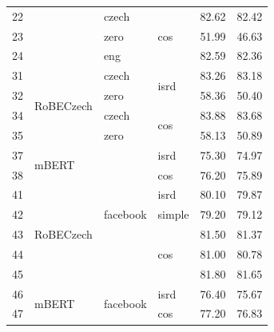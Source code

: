 \begin{table}[]
{\begin{tabular}{|l|l|l|l||ll|}
22 &                            & czech                     & \multirow{3}{*}{cos}  & 82.62   & 82.42 \\ \cline{1-1} \cline{3-3} \cline{5-6}
23 &                            & zero                      &                       & 51.99   & 46.63 \\ \cline{1-1} \cline{3-3} \cline{5-6}
24 &                            & eng                       &                       & 82.59   & 82.36 \\ \hline
31 & \multirow{4}{*}{RoBECzech} & czech                     & \multirow{2}{*}{isrd} & 83.26   & 83.18 \\ \cline{1-1} \cline{3-3} \cline{5-6}
32 &                            & zero                      &                       & 58.36   & 50.40 \\ \cline{1-1} \cline{3-6}
34 &                            & czech                     & \multirow{2}{*}{cos}  & 83.88   & 83.68 \\ \cline{1-1} \cline{3-3} \cline{5-6}
35 &                            & zero                      &                       & 58.13   & 50.89 \\ \hline
37 & \multirow{2}{*}{mBERT}     & \multirow{7}{*}{facebook} & isrd                  & 75.30   & 74.97 \\ \cline{1-1} \cline{4-6}
38 &                            &                           & cos                   & 76.20   & 75.89 \\ \cline{1-2} \cline{4-6}
41 & \multirow{5}{*}{RoBECzech} &                           & isrd                  & 80.10   & 79.87 \\ \cline{1-1} \cline{4-6}
42 &                            &                           & simple                & 79.20   & 79.12 \\ \cline{1-1} \cline{4-6}
43 &                            &                           & \multirow{3}{*}{cos}  & 81.50   & 81.37 \\ \cline{1-1} \cline{5-6}
44 &                            &                           &                       & 81.00   & 80.78 \\ \cline{1-1} \cline{5-6}
45 &                            &                           &                       & 81.80   & 81.65 \\ \hline
46 & \multirow{2}{*}{mBERT}     & \multirow{4}{*}{facebook} & isrd                  & 76.40   & 75.67 \\ \cline{1-1} \cline{4-6}
47 &                            &                           & cos                   & 77.20   & 76.83 \\ \cline{1-2} \cline{4-6}

\end{tabular}}
\end{table}
